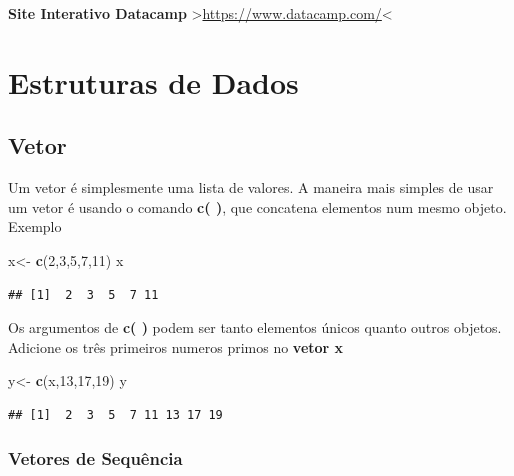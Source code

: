 \documentclass[]{book}
\newenvironment{Shaded}{\begin{snugshade}}{\end{snugshade}}
\newcommand{\DecValTok}[1]{\textcolor[rgb]{0.00,0.00,0.81}{#1}}
\newcommand{\KeywordTok}[1]{\textcolor[rgb]{0.13,0.29,0.53}{\textbf{#1}}}
\newcommand{\NormalTok}[1]{#1}
\newcommand{\StringTok}[1]{\textcolor[rgb]{0.31,0.60,0.02}{#1}}
\begin{document}
\textbf{Site Interativo Datacamp} \textgreater{}\url{https://www.datacamp.com/}\textless{}

\hypertarget{estruturas-de-dados}{%
\chapter{Estruturas de Dados}\label{estruturas-de-dados}}

\hypertarget{vetor}{%
\section{Vetor}\label{vetor}}

Um vetor é simplesmente uma lista de valores.
A maneira mais simples de usar um vetor é usando o comando \textbf{c( )}, que concatena elementos num mesmo objeto.
Exemplo

\begin{Shaded}
\begin{Highlighting}[]
\NormalTok{x<-}\StringTok{ }\KeywordTok{c}\NormalTok{(}\DecValTok{2}\NormalTok{,}\DecValTok{3}\NormalTok{,}\DecValTok{5}\NormalTok{,}\DecValTok{7}\NormalTok{,}\DecValTok{11}\NormalTok{) }
\NormalTok{x}
\end{Highlighting}
\end{Shaded}

\begin{verbatim}
## [1]  2  3  5  7 11
\end{verbatim}

Os argumentos de \textbf{c( )} podem ser tanto elementos únicos quanto outros objetos. Adicione os três primeiros numeros primos no \textbf{vetor x}

\begin{Shaded}
\begin{Highlighting}[]
\NormalTok{y<-}\StringTok{ }\KeywordTok{c}\NormalTok{(x,}\DecValTok{13}\NormalTok{,}\DecValTok{17}\NormalTok{,}\DecValTok{19}\NormalTok{)}
\NormalTok{y}
\end{Highlighting}
\end{Shaded}

\begin{verbatim}
## [1]  2  3  5  7 11 13 17 19
\end{verbatim}

\hypertarget{vetores-de-sequencia}{%
\subsection{Vetores de Sequência}\label{vetores-de-sequencia}}
\end{document}
